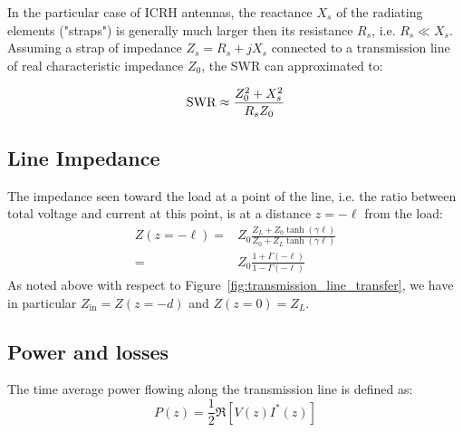 In the particular case of ICRH antennas, the reactance $X_s$ of the radiating elements ("straps") is generally much larger then its resistance $R_s$, i.e. $R_s \ll X_s$. Assuming a strap of impedance $Z_s=R_s+j X_s$ connected to a transmission line of real characteristic impedance $Z_0$, the SWR can approximated to:

\begin{equation}
	{\mathrm{SWR}} \approx \frac{Z_0^2 + X_s^2}{R_s Z_0}
\end{equation}



\subsection{Line Impedance}
The impedance seen toward the load at a point of the line, i.e. the ratio between total voltage and current at this point, is at a distance $z=-\ell$ from the load:
\begin{subequations}
	\begin{align}
Z(z=-\ell) 
	=& Z_0 \frac{Z_L + Z_0 \tanh( \gamma \ell)}{Z_0 + Z_L \tanh(\gamma \ell)} \\
	=& Z_0 \frac{1 + \Gamma(-\ell) }{1 - \Gamma(-\ell) }
	\end{align}
\end{subequations}
As noted above with respect to Figure~\ref{fig:transmission_line_transfer}, we have in particular $Z_{\mathrm{in}}=Z(z=-d)$ and $Z(z=0)=Z_L$.

\subsection{Power and losses}\label{sec:power_and_losses}
The time average power flowing along the transmission line is defined as:
\begin{equation}
P (z) = \frac{1}{2} \Re\left[V(z) I^*(z)\right] 
\label{eq:power_time_average_general}
\end{equation}


